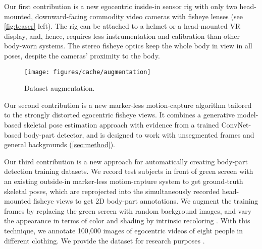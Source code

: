 \documentclass[runningheads]{llncs}
\begin{document}
Our first contribution is a new egocentric inside-in sensor rig with only two head-mounted, downward-facing commodity video cameras with fisheye lenses (see \cref{fig:teaser} left).
%
The rig can be attached to a helmet or a head-mounted VR display, and, hence, requires less instrumentation and calibration
%
than other body-worn systems.
%
The stereo fisheye optics keep the whole body in view in all poses, despite the cameras' proximity to the body. %
%
%
%
%
%
%
%

\begin{wrapfigure}{R}{0.4\textwidth}%
	\vspace{-1.5\baselineskip}
	\centering%
	\texttt{[image: figures/cache/augmentation]}\vspace{-0.5em}
	\caption{\label{fig:augmentation}Dataset augmentation.}\vspace{-0.5cm}
\end{wrapfigure}


Our second contribution is a new marker-less motion-capture algorithm tailored to the strongly distorted egocentric fisheye views.
It combines a generative model-based skeletal pose estimation approach with evidence from a trained ConvNet-based body-part detector, and is designed to work with unsegmented frames and general backgrounds (\cref{sec:method}).


Our third contribution is a new approach for automatically creating body-part detection training datasets.
%
We record test subjects in front of green screen with an existing outside-in marker-less motion-capture system to get ground-truth skeletal poses, which are reprojected into the simultaneously recorded head-mounted fisheye views to get 2D body-part annotations.
%
We augment the training frames by replacing the green screen with random background images, and vary the appearance in terms of color and shading by intrinsic recoloring \cite{MekaZRT2016}.
With this technique, we annotate 100,000 images of egocentric videos of eight people in different clothing.
We provide the dataset for research purposes \cite{EgoCapData2016}.



%
%
%

%
%
%
%
\end{document}
